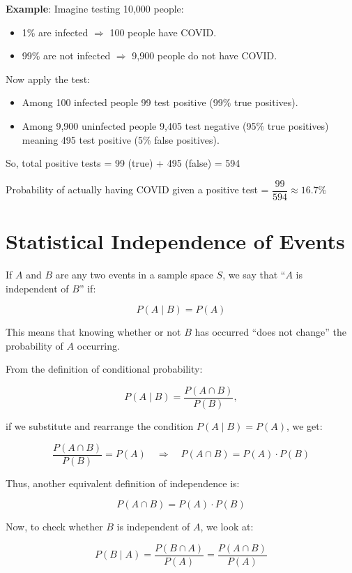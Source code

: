 \documentclass[twoside]{book}
\begin{document}
\textbf{Example}: Imagine testing 10{,}000 people:

\begin{itemize}
    \item 1\% are infected $\Rightarrow$ 100 people have COVID.
    \item 99\% are not infected $\Rightarrow$ 9{,}900 people do not have COVID.
\end{itemize}

Now apply the test:

\begin{itemize}
    \item Among 100 infected people 99 test positive (99\% true positives).
    \item Among 9{,}900 uninfected people 9{,}405 test negative (95\% true positives) meaning 495 test positive (5\% false positives).
\end{itemize}

\noindent
So, total positive tests = 99 (true) + 495 (false) = 594

Probability of actually having COVID given a positive test = $ \dfrac{99}{594} \approx 16.7\% $

\section{Statistical Independence of Events}

If $A$ and $B$ are any two events in a sample space $S$, we say that ``$A$ is independent of $B$'' if:

$$
P(A \mid B) = P(A)
$$

This means that knowing whether or not $B$ has occurred ``does not change'' the probability of $A$ occurring.

From the definition of conditional probability:

$$
P(A \mid B) = \frac{P(A \cap B)}{P(B)},
$$

if we substitute and rearrange the condition $P(A \mid B) = P(A)$, we get:

$$
\frac{P(A \cap B)}{P(B)} = P(A) \quad \Rightarrow \quad P(A \cap B) = P(A) \cdot P(B)
$$

Thus, another equivalent definition of independence is:

$$
P(A \cap B) = P(A) \cdot P(B)
$$

Now, to check whether $B$ is independent of $A$, we look at:

$$
P(B \mid A) = \frac{P(B \cap A)}{P(A)} = \frac{P(A \cap B)}{P(A)}
$$
\end{document}
